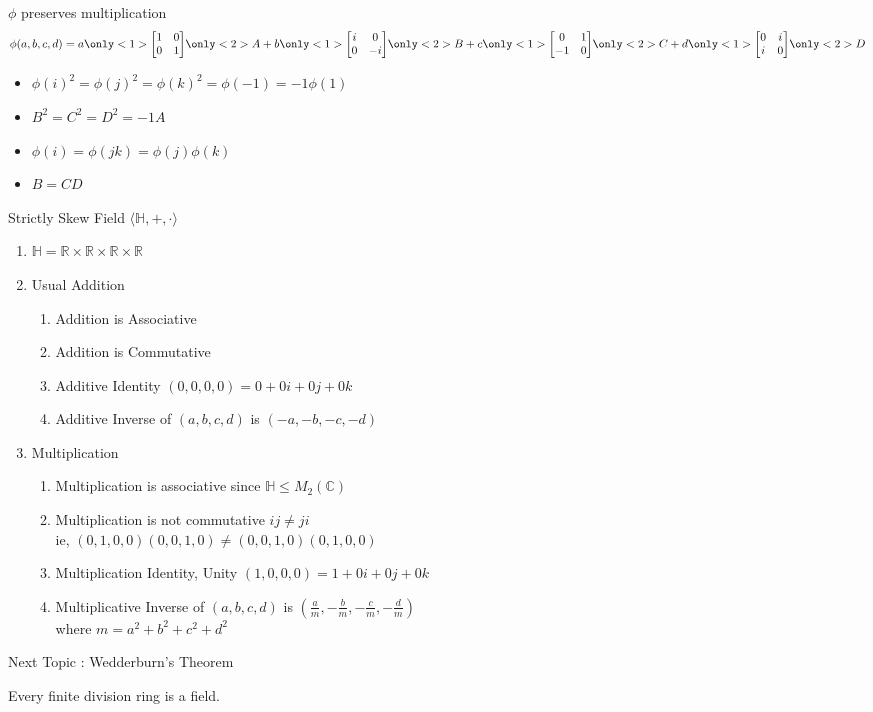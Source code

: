 \documentclass{beamer}
\begin{document}
\begin{frame}{$\phi$ preserves multiplication}
	$$ \phi(a,b,c,d) = a\only<1>{\begin{bmatrix} 1 & 0 \\ 0 & 1 \end{bmatrix}}\only<2>{A} + b\only<1>{\begin{bmatrix}i & 0 \\ 0 & -i \end{bmatrix}}\only<2>{B} + c\only<1>{\begin{bmatrix}0 & 1 \\ -1 & 0 \end{bmatrix}}\only<2>{C} + d\only<1>{\begin{bmatrix}0 & i \\ i & 0 \end{bmatrix}}\only<2>{D}$$

\begin{itemize}
	\item<1-> $\phi(i)^2 = \phi(j)^2 = \phi(k)^2 = \phi(-1) = -1 \phi(1)$
	\item<2> $B^2 = C^2 = D^2 = -1A$
	\item<1-> $\phi(i)=\phi(jk) = \phi(j)\phi(k)$
	\item<2> $B = CD$
\end{itemize}
\end{frame}

\begin{frame}{Strictly Skew Field $\langle \mathbb{H},+,\cdot \rangle$}
\begin{enumerate}
	\item $\mathbb{H} = \mathbb{R} \times \mathbb{R} \times \mathbb{R} \times \mathbb{R}$
	\item Usual Addition
	\begin{enumerate}
		\item Addition is Associative
		\item Addition is Commutative
		\item Additive Identity $(0,0,0,0) = 0+0i+0j+0k$
		\item Additive Inverse of $(a,b,c,d)$ is $(-a,-b,-c,-d)$
	\end{enumerate}
	\item Multiplication
	\begin{enumerate}
		\item Multiplication is associative since $\mathbb{H} \le M_2(\mathbb{C})$
		\item {\color{red}Multiplication is not commutative $ij \ne ji$ }\\
			 ie, $(0,1,0,0)(0,0,1,0) \ne (0,0,1,0)(0,1,0,0)$
		\item Multiplication Identity, Unity $(1,0,0,0) = 1+0i+0j+0k$
		\item Multiplicative Inverse of $(a,b,c,d)$ is $\left( \frac{a}{m},-\frac{b}{m},-\frac{c}{m},-\frac{d}{m}\right)$\\
			 where $m = a^2+b^2+c^2+d^2$
	\end{enumerate}
\end{enumerate}
\end{frame}

\begin{frame}{Next Topic  : Wedderburn's Theorem}
\begin{theorem}[Wedderburn]
Every finite division ring is a field.
\end{theorem}
\end{frame}
\end{document}
